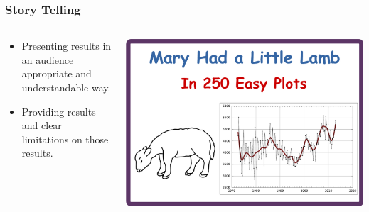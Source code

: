 \begin{frame}
\frametitle{Story Telling}

\begin{center}


\begin{columns}

\begin{column}{0.5\textwidth}
\begin{center}
\begin{itemize}
\item Presenting results in an audience appropriate and understandable way.
\item Providing results and clear limitations on those results.
\end{itemize}
\end{center}
\end{column}

\begin{column}{0.5\textwidth}
\includegraphics[width=1.0\textwidth]{graphics/mary_had.pdf}
\end{column}

\end{columns}

\end{center}

\end{frame}


